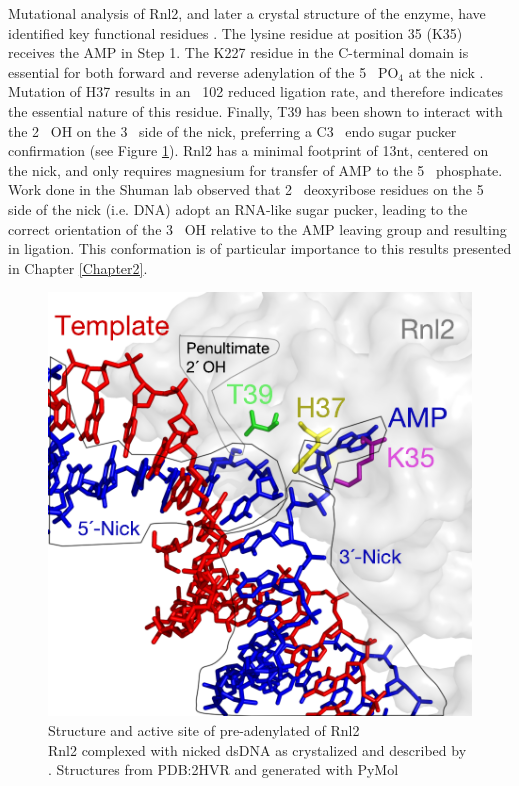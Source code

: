 Mutational analysis of Rnl2, and later a crystal structure of the enzyme, have identified key functional residues \citep{Ho2004, Nandakumar2006,Nandakumar2004a,Yin2003d}. The lysine residue at position 35 (K35) receives the AMP in Step 1. The K227 residue in the C-terminal domain is essential for both forward and reverse adenylation of the 5\textprime~ PO$_4$ at the nick \citep{Viollet2011}. Mutation of H37 results in an ~102 reduced ligation rate, and therefore indicates the essential nature of this residue. Finally, T39 has been shown to interact with the 2\textprime~ OH on the 3\textprime~ side of the nick, preferring a C3\textprime~ endo sugar pucker confirmation (see Figure \ref{fig:Rnl2 Active Site Residues}). Rnl2 has a minimal footprint of 13nt, centered on the nick, and only requires magnesium for transfer of AMP to the 5\textprime~ phosphate. Work done in the Shuman lab \citep{Nandrakumar2006} observed that 2\textprime~ deoxyribose residues on the 5\textprime~ side of the nick (i.e. DNA) adopt an RNA-like sugar pucker, leading to the correct orientation of the 3\textprime~ OH relative to the AMP leaving group and resulting in ligation. This conformation is of particular importance to this results presented in Chapter \ref{Chapter2}.

\begin{figure}[htbp]
	\centering 
	\includegraphics{Figures/Chapter1/Rnl2_Active_Site_Residues.pdf}
	\caption[Active site of T4 RNA Ligase 2 with highlighted residues]
	{
		Structure and active site of pre-adenylated of Rnl2\\[0.25cm]
		Rnl2 complexed with nicked dsDNA as crystalized and described by \citep{Nandakumar2006}. Structures from PDB:2HVR and generated with PyMol
	}
	\label{fig:Rnl2 Active Site Residues}
\end{figure}

